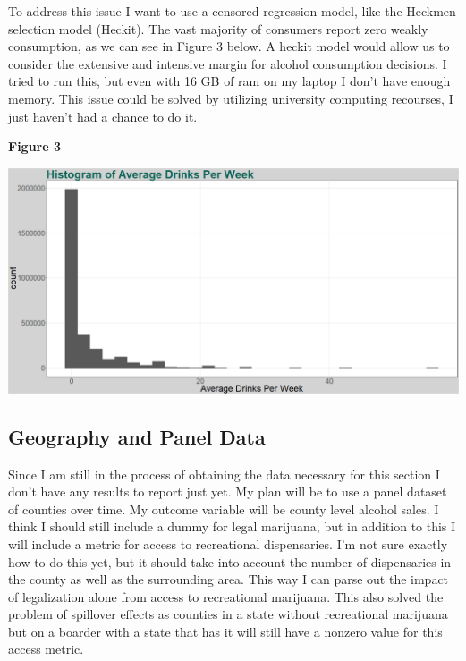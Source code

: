 \documentclass[11pt]{article}
\begin{document}
To address this issue I want to use a censored regression model, like the Heckmen selection model (Heckit). The vast majority of consumers report zero weakly consumption, as we can see in Figure 3 below. A heckit model would allow us to consider the extensive and intensive margin for alcohol consumption decisions. I tried to run this, but even with 16 GB of ram on my laptop I don't have enough memory. This issue could be solved by utilizing university computing recourses, I just haven't had a chance to do it. 

\begin{center}
	
	\centering
	\textbf{Figure 3}\par\medskip
	\includegraphics[width=1\linewidth]{Hist_nm_aved_week.png}
\end{center}



\subsection{Geography and Panel Data}  

Since I am still in the process of obtaining the data necessary for this section I don't have any results to report just yet. My plan will be to use a panel dataset of counties over time. My outcome variable will be county level alcohol sales. I think I should still include a dummy for legal marijuana, but in addition to this I will include a metric for access to recreational dispensaries. I'm not sure exactly how to do this yet, but it should take into account the number of dispensaries in the county as well as the surrounding area. This way I can parse out the impact of legalization alone from access to recreational marijuana. This also solved the problem of spillover effects as counties in a state without recreational marijuana but on a boarder with a state that has it will still have a nonzero value for this access metric. \par 
\end{document}
